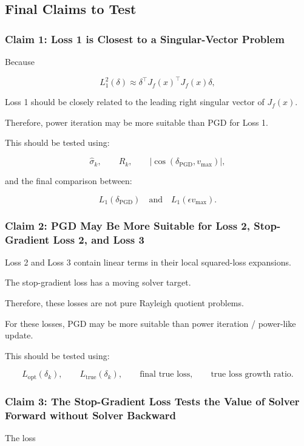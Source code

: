 \documentclass{article}
\begin{document}
\subsection{Final Claims to Test}

\subsubsection{Claim 1: Loss 1 is Closest to a Singular-Vector Problem}

Because

\[
L_1^2(\delta)
\approx
\delta^\top J_f(x)^\top J_f(x)\delta,
\]

Loss 1 should be closely related to the leading right singular vector of \(J_f(x)\).

Therefore, power iteration may be more suitable than PGD for Loss 1.

This should be tested using:

\[
\hat{\sigma}_k,
\qquad
R_k,
\qquad
|\cos(\delta_{\mathrm{PGD}},v_{\max})|,
\]

and the final comparison between:

\[
L_1(\delta_{\mathrm{PGD}})
\quad
\text{and}
\quad
L_1(\epsilon v_{\max}).
\]

\subsubsection{Claim 2: PGD May Be More Suitable for Loss 2, Stop-Gradient Loss 2, and Loss 3}

Loss 2 and Loss 3 contain linear terms in their local squared-loss expansions.

The stop-gradient loss has a moving solver target.

Therefore, these losses are not pure Rayleigh quotient problems.

For these losses, PGD may be more suitable than power iteration / power-like update.

This should be tested using:

\[
L_{\mathrm{opt}}(\delta_k),
\qquad
L_{\mathrm{true}}(\delta_k),
\qquad
\text{final true loss},
\qquad
\text{true loss growth ratio}.
\]

\subsubsection{Claim 3: The Stop-Gradient Loss Tests the Value of Solver Forward without Solver Backward}

The loss
\end{document}
